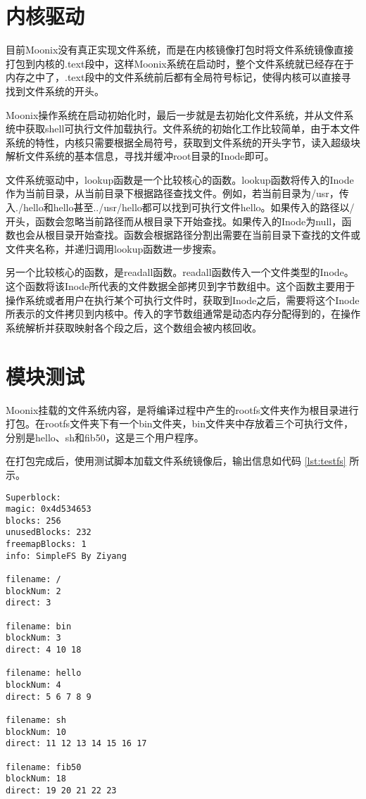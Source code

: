 \section{内核驱动}

目前Moonix没有真正实现文件系统，而是在内核镜像打包时将文件系统镜像直接打包到内核的.text段中，这样Moonix系统在启动时，整个文件系统就已经存在于内存之中了，.text段中的文件系统前后都有全局符号标记，使得内核可以直接寻找到文件系统的开头。

Moonix操作系统在启动初始化时，最后一步就是去初始化文件系统，并从文件系统中获取shell可执行文件加载执行。文件系统的初始化工作比较简单，由于本文件系统的特性，内核只需要根据全局符号，获取到文件系统的开头字节，读入超级块解析文件系统的基本信息，寻找并缓冲root目录的Inode即可。

文件系统驱动中，lookup函数是一个比较核心的函数。lookup函数将传入的Inode作为当前目录，从当前目录下根据路径查找文件。例如，若当前目录为/usr，传入./hello和hello甚至../usr/hello都可以找到可执行文件hello。如果传入的路径以/开头，函数会忽略当前路径而从根目录下开始查找。如果传入的Inode为null，函数也会从根目录开始查找。函数会根据路径分割出需要在当前目录下查找的文件或文件夹名称，并递归调用lookup函数进一步搜索。

另一个比较核心的函数，是readall函数。readall函数传入一个文件类型的Inode。这个函数将该Inode所代表的文件数据全部拷贝到字节数组中。这个函数主要用于操作系统或者用户在执行某个可执行文件时，获取到Inode之后，需要将这个Inode所表示的文件拷贝到内核中。传入的字节数组通常是动态内存分配得到的，在操作系统解析并获取映射各个段之后，这个数组会被内核回收。

\section{模块测试}

Moonix挂载的文件系统内容，是将编译过程中产生的rootfs文件夹作为根目录进行打包。在rootfs文件夹下有一个bin文件夹，bin文件夹中存放着三个可执行文件，分别是hello、sh和fib50，这是三个用户程序。

在打包完成后，使用测试脚本加载文件系统镜像后，输出信息如代码 \ref{lst:testfs} 所示。

\begin{minipage}[c]{0.95\textwidth}
\begin{lstlisting}[caption={测试文件系统镜像}, label={lst:testfs}]
Superblock:
magic: 0x4d534653
blocks: 256
unusedBlocks: 232
freemapBlocks: 1
info: SimpleFS By Ziyang

filename: /
blockNum: 2
direct: 3

filename: bin
blockNum: 3
direct: 4 10 18

filename: hello
blockNum: 4
direct: 5 6 7 8 9

filename: sh
blockNum: 10
direct: 11 12 13 14 15 16 17

filename: fib50
blockNum: 18
direct: 19 20 21 22 23
\end{lstlisting}
\end{minipage}

